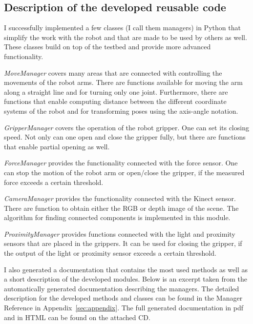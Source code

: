     \subsection{Description of the developed reusable code}
        I successfully implemented a few classes (I call them managers) in Python that simplify the work with the \CloPeMa\/ robot and that are made to be used by others as well. These classes build on top of the \CloPeMa\/ testbed and provide more advanced functionality.

        \emph{MoveManager} covers many areas that are connected with controlling the movements of the robot arms. There are functions available for moving the arm along a straight line and for turning only one joint. Furthermore, there are functions that enable computing distance between the different coordinate systems of the robot and for transforming poses using the axis-angle notation.

        \emph{GripperManager} covers the operation of the robot gripper. One can set its closing speed. Not only can one open and close the gripper fully, but there are functions that enable partial opening as well.

        \emph{ForceManager} provides the functionality connected with the force sensor. One can stop the motion of the robot arm or open/close the gripper, if the measured force exceeds a certain threshold.

        \emph{CameraManager} provides the functionality connected with the Kinect sensor. There are function to obtain either the RGB or depth image of the scene. The algorithm for finding connected components is implemented in this module.

        \emph{ProximityManager} provides functions connected with the light and proximity sensors that are placed in the grippers. It can be used for closing the gripper, if the output of the light or proximity sensor exceeds a certain threshold.

        I also generated a documentation that contains the most used methods as well as a short description of the developed modules. Below is an excerpt taken from the automatically generated documentation describing the managers. The detailed description for the developed methods and classes can be found in the Manager Reference in Appendix~\ref{sec:appendix}. The full generated documentation in pdf and in HTML can be found on the attached CD.



